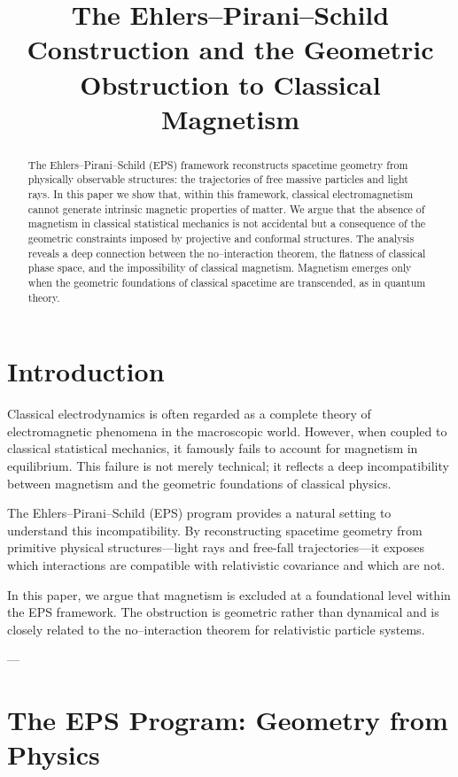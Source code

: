 \documentclass[11pt]{article}
\title{\textbf{The Ehlers--Pirani--Schild Construction and the Geometric Obstruction to Classical Magnetism}}
\author{}
\date{}
\begin{document}
\maketitle

\begin{abstract}
The Ehlers--Pirani--Schild (EPS) framework reconstructs spacetime geometry from physically observable structures: the trajectories of free massive particles and light rays. In this paper we show that, within this framework, classical electromagnetism cannot generate intrinsic magnetic properties of matter. We argue that the absence of magnetism in classical statistical mechanics is not accidental but a consequence of the geometric constraints imposed by projective and conformal structures. The analysis reveals a deep connection between the no–interaction theorem, the flatness of classical phase space, and the impossibility of classical magnetism. Magnetism emerges only when the geometric foundations of classical spacetime are transcended, as in quantum theory.
\end{abstract}

\tableofcontents

\section{Introduction}

Classical electrodynamics is often regarded as a complete theory of electromagnetic phenomena in the macroscopic world. However, when coupled to classical statistical mechanics, it famously fails to account for magnetism in equilibrium. This failure is not merely technical; it reflects a deep incompatibility between magnetism and the geometric foundations of classical physics.

The Ehlers–Pirani–Schild (EPS) program provides a natural setting to understand this incompatibility. By reconstructing spacetime geometry from primitive physical structures—light rays and free-fall trajectories—it exposes which interactions are compatible with relativistic covariance and which are not.

In this paper, we argue that magnetism is excluded at a foundational level within the EPS framework. The obstruction is geometric rather than dynamical and is closely related to the no–interaction theorem for relativistic particle systems.

---

\section{The EPS Program: Geometry from Physics}
\end{document}
